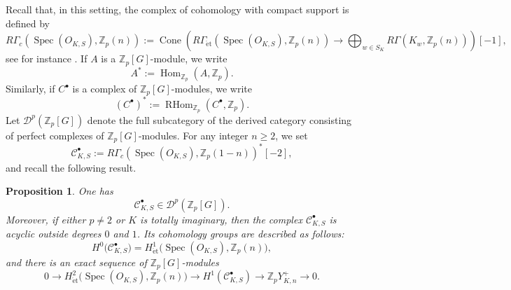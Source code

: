 \documentclass[a4paper,11pt]{article}
\newtheorem{proposition}[theorem]{Proposition}
\begin{document}
\noindent Recall that, in this setting, the complex of cohomology with compact support is
defined by
\[
R\Gamma_c(\operatorname{Spec}(O_{K,S}),\mathbb Z_p(n))
:=
\operatorname{Cone}
\left(
R\Gamma_{\mathrm{\acute{e}t}}(\operatorname{Spec}(O_{K,S}),\mathbb Z_p(n))
\longrightarrow
\bigoplus_{w\in S_K}R\Gamma(K_w,\mathbb Z_p(n))
\right)[-1],
\]
see for instance \cite[Eq.~(3)]{BurnsFlach2}.
If \(A\) is a \(\mathbb Z_p[G]\)-module, we write
\[
A^*:=\operatorname{Hom}_{\mathbb Z_p}(A,\mathbb Z_p).
\]
Similarly, if \(C^\bullet\) is a complex of \(\mathbb Z_p[G]\)-modules, we write
\[
(C^\bullet)^*
:=
\operatorname{RHom}_{\mathbb Z_p}(C^\bullet,\mathbb Z_p).
\]
Let \(\mathcal D^p(\mathbb Z_p[G])\) denote the full subcategory of the derived
category consisting of perfect complexes of \(\mathbb Z_p[G]\)-modules. 
For any integer $n\geq 2$, we set 
\[\mathcal{C}_{K,S}^\bullet:=R\Gamma_c(\operatorname{Spec}(O_{K,S}),\mathbb Z_p(1-n))^*[-2],
\]
and recall the following result.
\begin{proposition}\label{PROP-2-4}
One has
\[
\mathcal{C}_{K,S}^\bullet
\in
\mathcal D^p(\mathbb Z_p[G]).
\]
Moreover, if either \(p\neq 2\) or \(K\) is totally imaginary, then the complex
\(\mathcal{C}_{K,S}^\bullet\) is acyclic outside degrees
\(0\) and \(1\). Its cohomology groups are described as follows:
\[
H^0\bigl(\mathcal{C}_{K,S}^\bullet)
=
H^1_{\mathrm{\acute{e}t}}
\bigl(\operatorname{Spec}(O_{K,S}),\mathbb Z_p(n)\bigr),
\]
and there is an exact sequence of \(\mathbb Z_p[G]\)-modules
\[
0
\longrightarrow
H^2_{\mathrm{\acute{e}t}}
\bigl(\operatorname{Spec}(O_{K,S}),\mathbb Z_p(n)\bigr)
\longrightarrow
H^1(\mathcal{C}_{K,S}^\bullet)
\longrightarrow
\mathbb{Z}_pY_{K,n}^{+}
\longrightarrow
0.
\]
\end{proposition}
\end{document}
